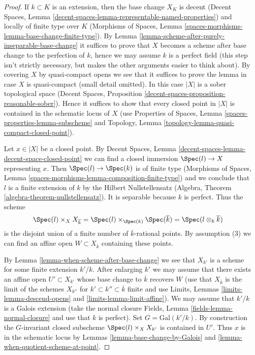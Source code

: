 \begin{proof}
If $k \subset K$ is an extension, then the base change $X_K$ is
decent (Decent Spaces, Lemma
\ref{decent-spaces-lemma-representable-named-properties})
and locally of finite type
over $K$ (Morphisms of Spaces, Lemma
\ref{spaces-morphisms-lemma-base-change-finite-type}).
By Lemma \ref{lemma-scheme-after-purely-inseparable-base-change}
it suffices to prove that $X$ becomes a scheme after base change to
the perfection of $k$, hence we may assume $k$ is a perfect field
(this step isn't strictly necessary, but makes the other arguments
easier to think about).
By covering $X$ by quasi-compact opens we see that it suffices to prove
the lemma in case $X$ is quasi-compact (small detail omitted).
In this case $|X|$ is a sober topological space
(Decent Spaces, Proposition
\ref{decent-spaces-proposition-reasonable-sober}).
Hence it suffices to show that every closed point in $|X|$
is contained in the schematic locus of $X$
(use Properties of Spaces, Lemma \ref{spaces-properties-lemma-subscheme} and
Topology, Lemma \ref{topology-lemma-quasi-compact-closed-point}).

\medskip\noindent
Let $x \in |X|$ be a closed point. By Decent Spaces, Lemma
\ref{decent-spaces-lemma-decent-space-closed-point}
we can find a closed immersion $\Spec(l) \to X$ representing $x$.
Then $\Spec(l) \to \Spec(k)$ is of finite type (Morphisms of Spaces,
Lemma \ref{spaces-morphisms-lemma-composition-finite-type}) and we
conclude that $l$ is a finite extension of $k$
by the Hilbert Nullstellensatz (Algebra, Theorem
\ref{algebra-theorem-nullstellensatz}). It is separable because
$k$ is perfect. Thus the scheme
$$
\Spec(l) \times_X X_{\overline{k}} =
\Spec(l) \times_{\Spec(k)} \Spec(\overline{k}) =
\Spec(l \otimes_k \overline{k})
$$
is the disjoint union of a finite number of $\overline{k}$-rational points.
By assumption (3) we can find an affine open $W \subset X_{\overline{k}}$
containing these points.

\medskip\noindent
By Lemma \ref{lemma-when-scheme-after-base-change} we see that $X_{k'}$
is a scheme for some finite extension $k'/k$. After enlarging
$k'$ we may assume that there exists an affine open $U' \subset X_{k'}$
whose base change to $\overline{k}$ recovers $W$
(use that $X_{\overline{k}}$ is the limit of the schemes $X_{k''}$
for $k' \subset k'' \subset \overline{k}$ finite and use
Limits, Lemmas \ref{limits-lemma-descend-opens} and
\ref{limits-lemma-limit-affine}). We may assume
that $k'/k$ is a Galois extension (take the normal closure
Fields, Lemma \ref{fields-lemma-normal-closure} and use
that $k$ is perfect). Set $G = \text{Gal}(k'/k)$.
By construction the $G$-invariant closed subscheme
$\Spec(l) \times_X X_{k'}$ is contained in $U'$.
Thus $x$ is in the schematic locus by
Lemmas \ref{lemma-base-change-by-Galois} and
\ref{lemma-when-quotient-scheme-at-point}.
\end{proof}

